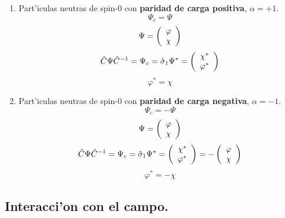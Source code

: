 \begin{enumerate}
\item Part'iculas neutras de spin-0 con \textbf{paridad de carga
positiva}, $\alpha=+1$.
\begin{equation}
\Psi_{c}=\Psi
\end{equation}
\begin{equation}
\Psi=\left(
\begin{array}
[c]{c}%
\varphi\\
\chi
\end{array}
\right)
\end{equation}
\begin{equation}
\hat{C}\Psi\hat{C}^{-1}=\Psi_{c}=\hat{\sigma}_{1}\Psi^{\ast}=\left(
\begin{array}
[c]{c}%
\chi^{\ast}\\
\varphi^{\ast}%
\end{array}
\right)
\end{equation}
\begin{equation}
\varphi^{\ast}=\chi
\end{equation}


\item Part'iculas neutras de spin-0 con \textbf{paridad de carga
negativa}, $\alpha=-1$.
\begin{equation}
\Psi_{c}=-\Psi
\end{equation}
\begin{equation}
\Psi=\left(
\begin{array}
[c]{c}%
\varphi\\
\chi
\end{array}
\right)
\end{equation}
\begin{equation}
\hat{C}\Psi\hat{C}^{-1}=\Psi_{c}=\hat{\sigma}_{1}\Psi^{\ast}=\left(
\begin{array}
[c]{c}%
\chi^{\ast}\\
\varphi^{\ast}%
\end{array}
\right)  =-\left(
\begin{array}
[c]{c}%
\varphi\\
\chi
\end{array}
\right)
\end{equation}
\begin{equation}
\varphi^{\ast}=-\chi
\end{equation}

\end{enumerate}

\subsection{Interacci'on con el campo.}

